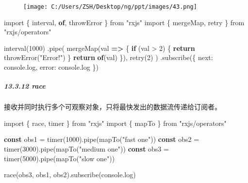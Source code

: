 \documentclass[
]{article}
\newenvironment{Shaded}{}{}
\newcommand{\BuiltInTok}[1]{#1}
\newcommand{\ControlFlowTok}[1]{\textcolor[rgb]{0.00,0.44,0.13}{\textbf{#1}}}
\newcommand{\DataTypeTok}[1]{\textcolor[rgb]{0.56,0.13,0.00}{#1}}
\newcommand{\DecValTok}[1]{\textcolor[rgb]{0.25,0.63,0.44}{#1}}
\newcommand{\FunctionTok}[1]{\textcolor[rgb]{0.02,0.16,0.49}{#1}}
\newcommand{\ImportTok}[1]{#1}
\newcommand{\KeywordTok}[1]{\textcolor[rgb]{0.00,0.44,0.13}{\textbf{#1}}}
\newcommand{\NormalTok}[1]{#1}
\newcommand{\OperatorTok}[1]{\textcolor[rgb]{0.40,0.40,0.40}{#1}}
\newcommand{\StringTok}[1]{\textcolor[rgb]{0.25,0.44,0.63}{#1}}
\begin{document}
\begin{figure}
\centering
\texttt{[image: C:/Users/ZSH/Desktop/ng/ppt/images/43.png]}
\caption{}
\end{figure}

\begin{Shaded}
\begin{Highlighting}[]
\ImportTok{import}\NormalTok{ \{ interval}\OperatorTok{,} \KeywordTok{of}\OperatorTok{,}\NormalTok{ throwError \} }\ImportTok{from} \StringTok{"rxjs"}
\ImportTok{import}\NormalTok{ \{ mergeMap}\OperatorTok{,}\NormalTok{ retry \} }\ImportTok{from} \StringTok{"rxjs/operators"}

\FunctionTok{interval}\NormalTok{(}\DecValTok{1000}\NormalTok{)}
  \OperatorTok{.}\FunctionTok{pipe}\NormalTok{(}
    \FunctionTok{mergeMap}\NormalTok{(val }\KeywordTok{=\textgreater{}}\NormalTok{ \{}
      \ControlFlowTok{if}\NormalTok{ (val }\OperatorTok{\textgreater{}} \DecValTok{2}\NormalTok{) \{}
        \ControlFlowTok{return} \FunctionTok{throwError}\NormalTok{(}\StringTok{"Error!"}\NormalTok{)}
\NormalTok{      \}}
      \ControlFlowTok{return} \KeywordTok{of}\NormalTok{(val)}
\NormalTok{    \})}\OperatorTok{,}
    \FunctionTok{retry}\NormalTok{(}\DecValTok{2}\NormalTok{)}
\NormalTok{  )}
  \OperatorTok{.}\FunctionTok{subscribe}\NormalTok{(\{}
    \DataTypeTok{next}\OperatorTok{:} \BuiltInTok{console}\OperatorTok{.}\FunctionTok{log}\OperatorTok{,}
    \DataTypeTok{error}\OperatorTok{:} \BuiltInTok{console}\OperatorTok{.}\FunctionTok{log}
\NormalTok{  \})}
\end{Highlighting}
\end{Shaded}

\hypertarget{13312-race}{%
\subparagraph{13.3.12 race}\label{13312-race}}

接收并同时执行多个可观察对象，只将最快发出的数据流传递给订阅者。

\begin{Shaded}
\begin{Highlighting}[]
\ImportTok{import}\NormalTok{ \{ race}\OperatorTok{,}\NormalTok{ timer \} }\ImportTok{from} \StringTok{"rxjs"}
\ImportTok{import}\NormalTok{ \{ mapTo \} }\ImportTok{from} \StringTok{"rxjs/operators"}

\KeywordTok{const}\NormalTok{ obs1 }\OperatorTok{=} \FunctionTok{timer}\NormalTok{(}\DecValTok{1000}\NormalTok{)}\OperatorTok{.}\FunctionTok{pipe}\NormalTok{(}\FunctionTok{mapTo}\NormalTok{(}\StringTok{"fast one"}\NormalTok{))}
\KeywordTok{const}\NormalTok{ obs2 }\OperatorTok{=} \FunctionTok{timer}\NormalTok{(}\DecValTok{3000}\NormalTok{)}\OperatorTok{.}\FunctionTok{pipe}\NormalTok{(}\FunctionTok{mapTo}\NormalTok{(}\StringTok{"medium one"}\NormalTok{))}
\KeywordTok{const}\NormalTok{ obs3 }\OperatorTok{=} \FunctionTok{timer}\NormalTok{(}\DecValTok{5000}\NormalTok{)}\OperatorTok{.}\FunctionTok{pipe}\NormalTok{(}\FunctionTok{mapTo}\NormalTok{(}\StringTok{"slow one"}\NormalTok{))}

\FunctionTok{race}\NormalTok{(obs3}\OperatorTok{,}\NormalTok{ obs1}\OperatorTok{,}\NormalTok{ obs2)}\OperatorTok{.}\FunctionTok{subscribe}\NormalTok{(}\BuiltInTok{console}\OperatorTok{.}\FunctionTok{log}\NormalTok{)}
\end{Highlighting}
\end{Shaded}
\end{document}
